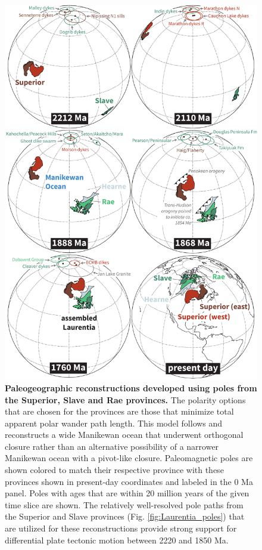 \documentclass[twocolumn, switch]{article} %
\begin{document}
\begin{figure}
\centering
\includegraphics[width=5.25 in]{../Figures/Fig2_Superior_Slave_reconstructions.pdf}
\caption{\textbf{Paleogeographic reconstructions developed using poles from the Superior, Slave and Rae provinces.} The polarity options that are chosen for the provinces are those that minimize total apparent polar wander path length. This model follows \cite{Swanson-Hysell2021a} and reconstructs a wide Manikewan ocean that underwent orthogonal closure rather than an alternative possibility of a narrower Manikewan ocean with a pivot-like closure. Paleomagnetic poles are shown colored to match their respective province with these provinces shown in present-day coordinates and labeled in the 0 Ma panel. Poles with ages that are within 20 million years of the given time slice are shown. The relatively well-resolved pole paths from the Superior and Slave provinces (Fig. \ref{fig:Laurentia_poles}) that are utilized for these reconstructions provide strong support for differential plate tectonic motion between 2220 and 1850 Ma.}
\label{fig:Superior_Slave_recons}
\end{figure}
\end{document}
